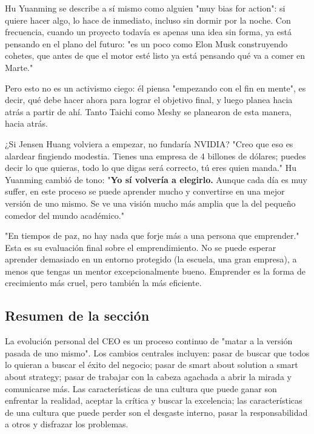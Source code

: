 Hu Yuanming se describe a sí mismo como alguien "muy bias for action": si quiere hacer algo, lo hace de inmediato, incluso sin dormir por la noche. Con frecuencia, cuando un proyecto todavía es apenas una idea sin forma, ya está pensando en el plano del futuro: "es un poco como Elon Musk construyendo cohetes, que antes de que el motor esté listo ya está pensando qué va a comer en Marte."

Pero esto no es un activismo ciego: él piensa "empezando con el fin en mente", es decir, qué debe hacer ahora para lograr el objetivo final, y luego planea hacia atrás a partir de ahí. Tanto Taichi como Meshy se planearon de esta manera, hacia atrás.

\begin{knowledgebox}{¿Si Jensen Huang volviera a empezar, no fundaría NVIDIA?}
"Creo que eso es alardear fingiendo modestia. Tienes una empresa de 4 billones de dólares; puedes decir lo que quieras, todo lo que digas será correcto, tú eres quien manda." Hu Yuanming cambió de tono: "\textbf{Yo sí volvería a elegirlo.} Aunque cada día es muy suffer, en este proceso se puede aprender mucho y convertirse en una mejor versión de uno mismo. Se ve una visión mucho más amplia que la del pequeño comedor del mundo académico."
\end{knowledgebox}

"En tiempos de paz, no hay nada que forje más a una persona que emprender." Esta es su evaluación final sobre el emprendimiento. No se puede esperar aprender demasiado en un entorno protegido (la escuela, una gran empresa), a menos que tengas un mentor excepcionalmente bueno. Emprender es la forma de crecimiento más cruel, pero también la más eficiente.

\subsection{Resumen de la sección}

La evolución personal del CEO es un proceso continuo de "matar a la versión pasada de uno mismo". Los cambios centrales incluyen: pasar de buscar que todos lo quieran a buscar el éxito del negocio; pasar de smart about solution a smart about strategy; pasar de trabajar con la cabeza agachada a abrir la mirada y comunicarse más. Las características de una cultura que puede ganar son enfrentar la realidad, aceptar la crítica y buscar la excelencia; las características de una cultura que puede perder son el desgaste interno, pasar la responsabilidad a otros y disfrazar los problemas.
